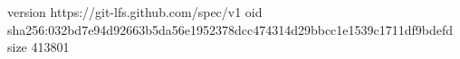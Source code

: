 version https://git-lfs.github.com/spec/v1
oid sha256:032bd7e94d92663b5da56e1952378dcc474314d29bbcc1e1539c1711df9bdefd
size 413801
